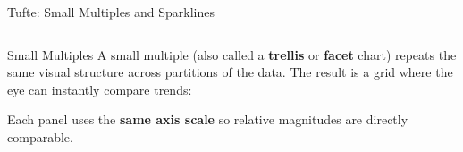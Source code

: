 \documentclass[aspectratio=169,10pt]{beamer}
\begin{document}
\begin{frame}{Tufte: Small Multiples and Sparklines}
  \begin{columns}[T]
      \begin{block}{Small Multiples}
        \small A small multiple (also called a \textbf{trellis} or \textbf{facet} chart) repeats the same visual structure across partitions of the data.  The result is a grid where the eye can instantly compare trends:
        \vspace{4pt}
        \begin{center}
        \end{center}
        \vspace{2pt}
        Each panel uses the \textbf{same axis scale} so relative magnitudes are directly comparable.
      \end{block}


\end{columns}
\end{frame}
\end{document}

